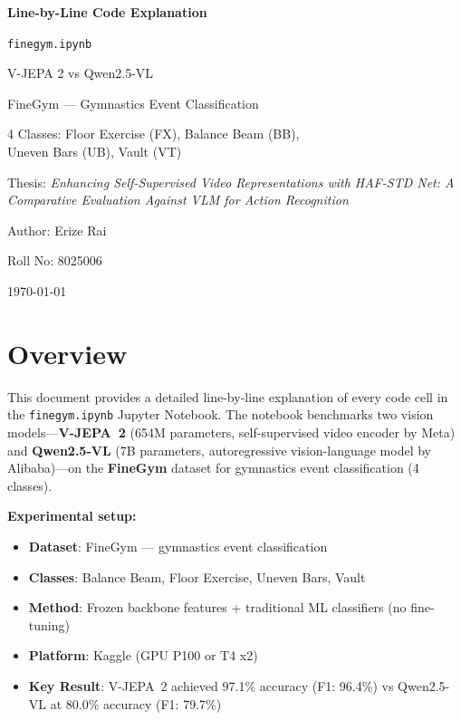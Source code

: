 \documentclass[a4paper, 12pt]{article}
\begin{document}
\begin{titlepage}
\centering
\vspace*{3cm}
{\Huge\bfseries Line-by-Line Code Explanation\par}
\vspace{0.8cm}
{\LARGE\texttt{finegym.ipynb}\par}
\vspace{1.5cm}
{\Large V-JEPA 2 vs Qwen2.5-VL\par}
{\Large FineGym --- Gymnastics Event Classification\par}
\vspace{1cm}
{\large 4 Classes: Floor Exercise (FX), Balance Beam (BB),\\
Uneven Bars (UB), Vault (VT)\par}
\vspace{2cm}
{\large Thesis: \textit{Enhancing Self-Supervised Video Representations with HAF-STD Net: A Comparative Evaluation Against VLM for Action Recognition}\par}
\vspace{1cm}
{\large Author: Erize Rai\par}
{\large Roll No: 8025006\par}
\vfill
{\large\today\par}
\end{titlepage}

\tableofcontents
\newpage

\section{Overview}

This document provides a detailed line-by-line explanation of every code cell in the \texttt{finegym.ipynb} Jupyter Notebook. The notebook benchmarks two vision models---\textbf{V-JEPA~2} (654M parameters, self-supervised video encoder by Meta) and \textbf{Qwen2.5-VL} (7B parameters, autoregressive vision-language model by Alibaba)---on the \textbf{FineGym} dataset for gymnastics event classification (4 classes).

\textbf{Experimental setup:}
\begin{itemize}[nosep]
  \item \textbf{Dataset}: FineGym --- gymnastics event classification
  \item \textbf{Classes}: Balance Beam, Floor Exercise, Uneven Bars, Vault
  \item \textbf{Method}: Frozen backbone features + traditional ML classifiers (no fine-tuning)
  \item \textbf{Platform}: Kaggle (GPU P100 or T4 x2)
  \item \textbf{Key Result}: V-JEPA~2 achieved 97.1\% accuracy (F1: 96.4\%) vs Qwen2.5-VL at 80.0\% accuracy (F1: 79.7\%)
\end{itemize}
\end{document}

